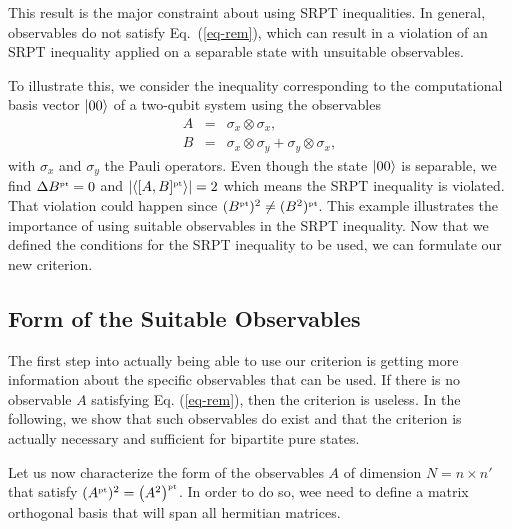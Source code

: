 This result is the major constraint about using SRPT inequalities. In general, observables do not  satisfy Eq.~(\ref{eq-rem}), which can result in a violation of an SRPT inequality applied on a separable state with unsuitable observables. 

To illustrate this, we consider the inequality corresponding to the computational basis vector $| 00 \rangle$ of a two-qubit system using the observables 
\begin{eqnarray}
A &=& \sigma_x\otimes\sigma_x, \\
B &=& \sigma_x \otimes \sigma_y +  \sigma_y \otimes \sigma_x,
\end{eqnarray}
with $\sigma_x$ and $\sigma_y$ the Pauli operators. Even though the state $| 00 \rangle$ is separable, we find $\Delta B^{\mbox{\tiny \textup{pt}}} =0$ and $|\langle [A,B]^{\mbox{\tiny \textup{pt}}} \rangle|=2$ which means the SRPT inequality is violated. That violation could happen since $(B^{\mbox{\tiny \textup{pt}}})^2 \neq (B^2)^{\mbox{\tiny \textup{pt}}}$. This example illustrates the importance of using suitable observables in the SRPT inequality. Now that we defined the conditions for the SRPT inequality to be used, we can formulate our new criterion.


\subsection{Form of the Suitable Observables}

The first step into actually being able to use our criterion is getting more information about the specific observables that can be used. If there is no observable $A$ satisfying Eq. (\ref{eq-rem}), then the criterion is useless. In the following, we show that such observables do exist and that the criterion is actually necessary and sufficient for bipartite pure states.

Let us now characterize the form of the observables $A$ of dimension $N=n\times n'$ that satisfy $(A^{\mbox{\tiny \textup{pt}}})^2 = \left(A^2 \right)^{\mbox{\tiny \textup{pt}}}$. In order to do so, wee need to define a matrix orthogonal basis that will span all hermitian matrices. 

